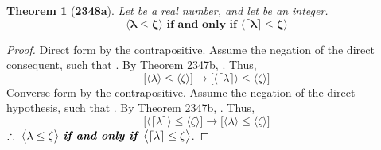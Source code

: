 \documentclass[preview]{standalone}
\newtheorem*{theorem*}{Theorem}
\begin{document}
\begin{theorem*}[\textbf{2348a}]
    Let \bm{$\lambda$} be a real number, 
    and let \bm{$\zeta$} be an integer.
    \begin{equation*}
        \bm{
        \big \langle \lambda \le \zeta \big \rangle
            \textbf{ if and only if } 
        \big \langle \lceil \lambda \rceil \le \zeta \big \rangle
        }
    \end{equation*}
\end{theorem*}

\begin{proof}
    Direct form by the contrapositive. 
    Assume the negation of the direct consequent,
    such that \bm{$\lceil \lambda \rceil > \zeta$}. 
    By Theorem 2347b, 
    \bm{$\lambda > \zeta$}.
    Thus,
    \begin{equation*}
        \bigg[
            \Big \langle \lambda \Big \rangle
                \leq 
            \Big \langle \zeta \Big \rangle
        \bigg]
            \rightarrow 
        \bigg[
            \Big \langle \lceil \lambda \rceil \Big \rangle
                \leq 
            \Big \langle \zeta \Big \rangle
        \bigg]
    \end{equation*}
    Converse form by the contrapositive. 
    Assume the negation of the direct hypothesis, 
    such that \bm{$\lambda > \zeta$}.
    By Theorem 2347b, \bm{$\lceil \lambda \rceil > \zeta$}. 
    Thus,
    \begin{equation*}
        \bigg[
            \Big \langle \lceil \lambda \rceil \Big \rangle
                \leq 
            \Big \langle \zeta \Big \rangle
        \bigg]
            \rightarrow 
        \bigg[
            \Big \langle \lambda \Big \rangle
                \leq 
            \Big \langle \zeta \Big \rangle
        \bigg]
    \end{equation*}
    $\therefore \text{\space} \relax{
        \big \langle \lambda \le \zeta \big \rangle
            \textbf{ \emph{if and only if} } 
        \big \langle \lceil \lambda \rceil \le \zeta \big \rangle}
    $.
\color{lightgray} \end{proof}
\end{document}
